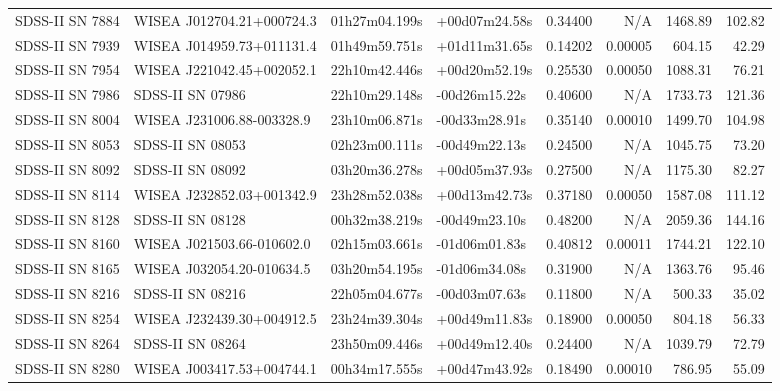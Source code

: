 \begin{longtable}{llllrrrr}
SDSS-II SN 7884  &       WISEA J012704.21+000724.3 &   01h27m04.199s &   +00d07m24.58s &  0.34400 &      N/A &  1468.89 &      102.82 \\
SDSS-II SN 7939  &       WISEA J014959.73+011131.4 &   01h49m59.751s &   +01d11m31.65s &  0.14202 &  0.00005 &   604.15 &       42.29 \\
SDSS-II SN 7954  &       WISEA J221042.45+002052.1 &   22h10m42.446s &   +00d20m52.19s &  0.25530 &  0.00050 &  1088.31 &       76.21 \\
SDSS-II SN 7986  &                SDSS-II SN 07986 &   22h10m29.148s &   -00d26m15.22s &  0.40600 &      N/A &  1733.73 &      121.36 \\
SDSS-II SN 8004  &       WISEA J231006.88-003328.9 &   23h10m06.871s &   -00d33m28.91s &  0.35140 &  0.00010 &  1499.70 &      104.98 \\
SDSS-II SN 8053  &                SDSS-II SN 08053 &   02h23m00.111s &   -00d49m22.13s &  0.24500 &      N/A &  1045.75 &       73.20 \\
SDSS-II SN 8092  &                SDSS-II SN 08092 &   03h20m36.278s &   +00d05m37.93s &  0.27500 &      N/A &  1175.30 &       82.27 \\
SDSS-II SN 8114  &       WISEA J232852.03+001342.9 &   23h28m52.038s &   +00d13m42.73s &  0.37180 &  0.00050 &  1587.08 &      111.12 \\
SDSS-II SN 8128  &                SDSS-II SN 08128 &   00h32m38.219s &   -00d49m23.10s &  0.48200 &      N/A &  2059.36 &      144.16 \\
SDSS-II SN 8160  &       WISEA J021503.66-010602.0 &   02h15m03.661s &   -01d06m01.83s &  0.40812 &  0.00011 &  1744.21 &      122.10 \\
SDSS-II SN 8165  &       WISEA J032054.20-010634.5 &   03h20m54.195s &   -01d06m34.08s &  0.31900 &      N/A &  1363.76 &       95.46 \\
SDSS-II SN 8216  &                SDSS-II SN 08216 &   22h05m04.677s &   -00d03m07.63s &  0.11800 &      N/A &   500.33 &       35.02 \\
SDSS-II SN 8254  &       WISEA J232439.30+004912.5 &   23h24m39.304s &   +00d49m11.83s &  0.18900 &  0.00050 &   804.18 &       56.33 \\
SDSS-II SN 8264  &                SDSS-II SN 08264 &   23h50m09.446s &   +00d49m12.40s &  0.24400 &      N/A &  1039.79 &       72.79 \\
SDSS-II SN 8280  &       WISEA J003417.53+004744.1 &   00h34m17.555s &   +00d47m43.92s &  0.18490 &  0.00010 &   786.95 &       55.09 \\

\end{longtable}
